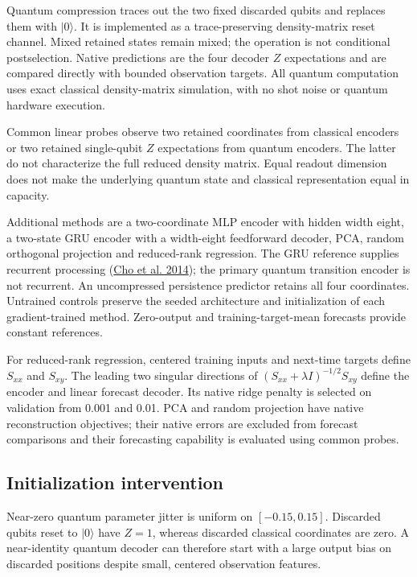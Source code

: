 \documentclass[
  11pt,
]{article}
\begin{document}
Quantum compression traces out the two fixed discarded qubits and
replaces them with \(|0\rangle\). It is implemented as a
trace-preserving density-matrix reset channel. Mixed retained states
remain mixed; the operation is not conditional postselection. Native
predictions are the four decoder \(Z\) expectations and are compared
directly with bounded observation targets. All quantum computation uses
exact classical density-matrix simulation, with no shot noise or quantum
hardware execution.

Common linear probes observe two retained coordinates from classical
encoders or two retained single-qubit \(Z\) expectations from quantum
encoders. The latter do not characterize the full reduced density
matrix. Equal readout dimension does not make the underlying quantum
state and classical representation equal in capacity.

Additional methods are a two-coordinate MLP encoder with hidden width
eight, a two-state GRU encoder with a width-eight feedforward decoder,
PCA, random orthogonal projection and reduced-rank regression. The GRU
reference supplies recurrent processing
(\protect\hyperlink{ref-cho2014encoder}{Cho et al. 2014}); the primary
quantum transition encoder is not recurrent. An uncompressed persistence
predictor retains all four coordinates. Untrained controls preserve the
seeded architecture and initialization of each gradient-trained method.
Zero-output and training-target-mean forecasts provide constant
references.

For reduced-rank regression, centered training inputs and next-time
targets define \(S_{xx}\) and \(S_{xy}\). The leading two singular
directions of \((S_{xx}+\lambda I)^{-1/2}S_{xy}\) define the encoder and
linear forecast decoder. Its native ridge penalty is selected on
validation from 0.001 and 0.01. PCA and random projection have native
reconstruction objectives; their native errors are excluded from
forecast comparisons and their forecasting capability is evaluated using
common probes.

\hypertarget{initialization-intervention}{%
\subsection{Initialization
intervention}\label{initialization-intervention}}

Near-zero quantum parameter jitter is uniform on \([-0.15,0.15]\).
Discarded qubits reset to \(|0\rangle\) have \(Z=1\), whereas discarded
classical coordinates are zero. A near-identity quantum decoder can
therefore start with a large output bias on discarded positions despite
small, centered observation features.
\end{document}
